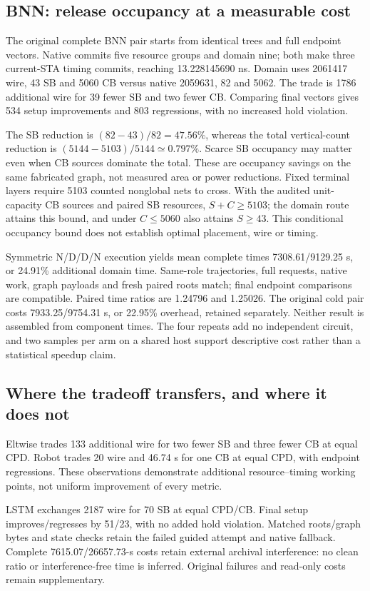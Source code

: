 \documentclass[conference,10pt]{IEEEtran}
\begin{document}
\subsection{BNN: release occupancy at a measurable cost}
The original complete BNN pair starts from identical trees and full endpoint vectors. Native commits five resource groups and domain nine; both make three current-STA timing commits, reaching 13.228145690 ns. Domain uses 2061417 wire, 43 SB and 5060 CB versus native 2059631, 82 and 5062. The trade is 1786 additional wire for 39 fewer SB and two fewer CB. Comparing final vectors gives 534 setup improvements and 803 regressions, with no increased hold violation.

The SB reduction is $(82-43)/82=47.56\%$, whereas the total vertical-count reduction is $(5144-5103)/5144\simeq0.797\%$. Scarce SB occupancy may matter even when CB sources dominate the total. These are occupancy savings on the same fabricated graph, not measured area or power reductions. Fixed terminal layers require 5103 counted nonglobal nets to cross. With the audited unit-capacity CB sources and paired SB resources, $S+C\ge5103$; the domain route attains this bound, and under $C\le5060$ also attains $S\ge43$. This conditional occupancy bound does not establish optimal placement, wire or timing.

Symmetric N/D/D/N execution yields mean complete times 7308.61/9129.25 s, or 24.91\% additional domain time. Same-role trajectories, full requests, native work, graph payloads and fresh paired roots match; final endpoint comparisons are compatible. Paired time ratios are 1.24796 and 1.25026. The original cold pair costs 7933.25/9754.31 s, or 22.95\% overhead, retained separately. Neither result is assembled from component times. The four repeats add no independent circuit, and two samples per arm on a shared host support descriptive cost rather than a statistical speedup claim.

\subsection{Where the tradeoff transfers, and where it does not}
Eltwise trades 133 additional wire for two fewer SB and three fewer CB at equal CPD. Robot trades 20 wire and 46.74 s for one CB at equal CPD, with endpoint regressions. These observations demonstrate additional resource--timing working points, not uniform improvement of every metric.

LSTM exchanges 2187 wire for 70 SB at equal CPD/CB. Final setup improves/regresses by 51/23, with no added hold violation. Matched roots/graph bytes and state checks retain the failed guided attempt and native fallback. Complete 7615.07/26657.73-s costs retain external archival interference: no clean ratio or interference-free time is inferred. Original failures and read-only costs remain supplementary.
\end{document}
